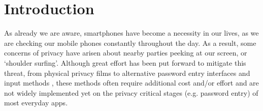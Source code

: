 \section{Introduction}
\label{sec-introduction}

As already we are aware, smartphones have become a necessity in our lives, as we are checking our mobile phones constantly throughout the day. As a result, some concerns of privacy have arisen about nearby parties peeking at our screen, or ‘shoulder surfing’. Although great effort has been put forward to mitigate this threat, from physical privacy films to alternative password entry interfaces \cite{wiedenbeck2006design} \cite{papadopoulos2017illusionpin} and input methods \cite{kumar2007reducing}, these methods often require additional cost and/or effort \cite{Chun2019Keep} and are not widely implemented yet on the privacy critical stages (e.g. password entry) of most everyday apps.

